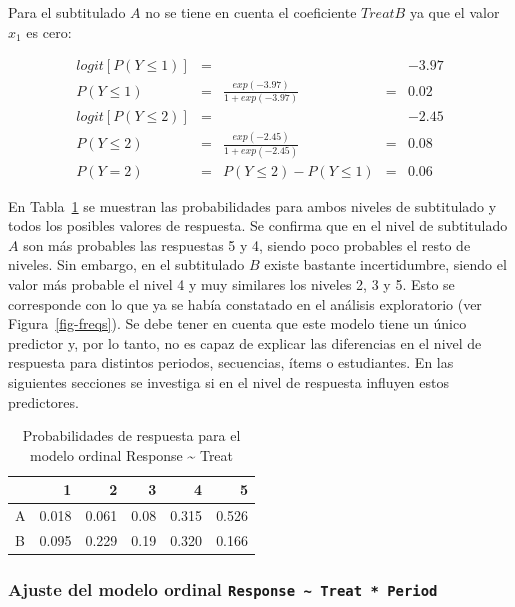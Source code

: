 \documentclass[
  12pt,
  a4paper,
  extrafontsizes,
  onecolumn,
  openright,
  table]{memoir}
\begin{document}
Para el subtitulado \(A\) no se tiene en cuenta el coeficiente
\(TreatB\) ya que el valor \(x_1\) es cero:

\[
\begin{aligned}
logit [P(Y \le 1)] & = & & & -3.97 \\
P(Y \le 1) & = & \frac{exp(-3.97)}{1 + exp(-3.97)} & = & 0.02 \\
logit [P(Y \le 2)] & = & & & -2.45 \\
P(Y \le 2) & = & \frac{exp(-2.45)}{1 + exp(-2.45)} & = & 0.08 \\
P(Y = 2) & = & P(Y \le 2) - P(Y \le 1) & = &  0.06 
\end{aligned}
\]

En Tabla~\ref{tbl-probs-clm-treat} se muestran las probabilidades para
ambos niveles de subtitulado y todos los posibles valores de respuesta.
Se confirma que en el nivel de subtitulado \(A\) son más probables las
respuestas 5 y 4, siendo poco probables el resto de niveles. Sin
embargo, en el subtitulado \(B\) existe bastante incertidumbre, siendo
el valor más probable el nivel 4 y muy similares los niveles 2, 3 y 5.
Esto se corresponde con lo que ya se había constatado en el análisis
exploratorio (ver Figura~\ref{fig-freqs}). Se debe tener en cuenta que
este modelo tiene un único predictor y, por lo tanto, no es capaz de
explicar las diferencias en el nivel de respuesta para distintos
periodos, secuencias, ítems o estudiantes. En las siguientes secciones
se investiga si en el nivel de respuesta influyen estos predictores.

\hypertarget{tbl-probs-clm-treat}{}
\begin{table}
\caption{\label{tbl-probs-clm-treat}Probabilidades de respuesta para el modelo ordinal Response
\textasciitilde{} Treat }\tabularnewline

\centering
\begin{tabular}{l|r|r|r|r|r}
\hline
  & 1 & 2 & 3 & 4 & 5\\
\hline
A & 0.018 & 0.061 & 0.08 & 0.315 & 0.526\\
\hline
B & 0.095 & 0.229 & 0.19 & 0.320 & 0.166\\
\hline
\end{tabular}
\end{table}

\hypertarget{sec-response-treat.period}{%
\subsubsection{\texorpdfstring{Ajuste del modelo ordinal
\texttt{Response\ \textasciitilde{}\ Treat\ *\ Period}}{Ajuste del modelo ordinal Response \textasciitilde{} Treat * Period}}\label{sec-response-treat.period}}
\end{document}
